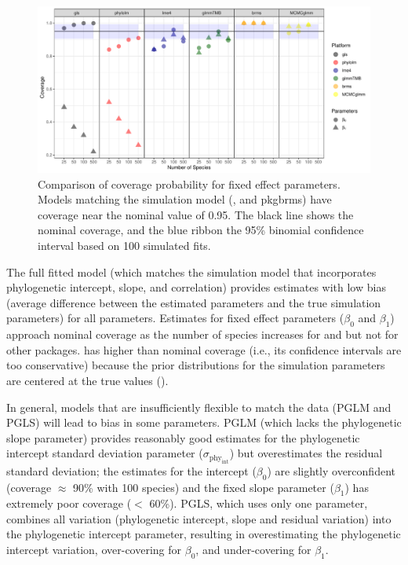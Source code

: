 \documentclass[12pt]{article}
\begin{document}
\begin{center}
\begin{figure}[H]
  \includegraphics[scale=0.7]{./figure/sscoverage.pdf}
  \caption{Comparison of coverage probability for fixed effect parameters. Models matching the simulation model (,  and pkg{brms}) have coverage near the nominal value of 0.95. The black line shows the nominal coverage, and the blue ribbon the 95\% binomial confidence interval based on 100 simulated fits. 
  }
\label{ssplot_coverage}
\end{figure}
\end{center}

The full fitted model (which matches the simulation model that incorporates phylogenetic intercept, slope, and correlation) provides estimates with low bias (average difference between the estimated parameters and the true simulation parameters) for all parameters. 
Estimates for fixed effect parameters ($\beta_0$ and $\beta_1$) approach nominal coverage as the number of species increases for  and  but not for other packages.  has higher than nominal coverage (i.e., its confidence intervals are too conservative) because the prior distributions for the simulation parameters are centered at the true values (\citet{li2018fitting}).

In general, models that are insufficiently flexible to match the data (PGLM and PGLS) will lead to bias in some parameters.
PGLM (which lacks the phylogenetic slope parameter) provides reasonably good estimates for the phylogenetic intercept standard deviation parameter ($\sigma_{\mathrm{phy_{int}}}$) but overestimates the residual standard deviation; the estimates for the intercept ($\beta_0$) are slightly overconfident (coverage $\approx$ 90\% with 100 species) and the fixed slope parameter ($\beta_1$) has extremely poor coverage ($<$ 60\%).
PGLS, which uses only one parameter, combines all variation (phylogenetic intercept, slope and residual variation) into the phylogenetic intercept parameter, resulting in overestimating the phylogenetic intercept variation, over-covering for $\beta_0$, and under-covering for $\beta_1$.
\end{document}
